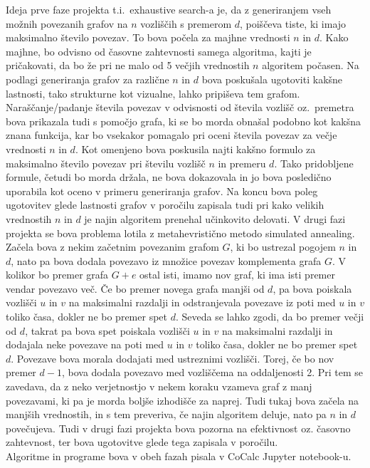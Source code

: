 \documentclass[12pt,a4paper]{amsart}
\theoremstyle{definition} %
\theoremstyle{plain} %
\begin{document}
Ideja prve faze projekta t.i.\ exhaustive search-a je, da z generiranjem vseh možnih povezanih grafov na $n$ vozliščih s premerom $d$, 
poiščeva tiste, ki imajo maksimalno število povezav. To bova počela za majhne vrednosti $n$ in $d$. Kako majhne, bo odvisno od časovne 
zahtevnosti samega algoritma, kajti je pričakovati, da bo že pri ne malo od 5 večjih vrednostih $n$ algoritem počasen. Na podlagi 
generiranja grafov za različne $n$ in $d$ bova poskušala ugotoviti kakšne lastnosti, tako strukturne kot vizualne, lahko pripiševa 
tem grafom. Naraščanje/padanje števila povezav v odvisnosti od števila vozlišč oz.\ premetra bova prikazala tudi s pomočjo grafa, 
ki se bo morda obnašal podobno kot kakšna znana funkcija, kar bo vsekakor pomagalo pri oceni števila povezav za večje vrednosti $n$ 
in $d$. Kot omenjeno bova poskusila najti kakšno formulo za maksimalno število povezav pri številu vozlišč $n$ in premeru $d$. Tako 
pridobljene formule, četudi bo morda držala, ne bova dokazovala in jo bova posledično uporabila kot oceno v primeru generiranja grafov. 
Na koncu bova poleg ugotovitev glede lastnosti grafov v poročilu zapisala tudi pri kako velikih vrednostih $n$ in $d$ je najin algoritem 
prenehal učinkovito delovati. V drugi fazi projekta se bova problema lotila z metahevristično metodo simulated annealing. Začela bova z 
nekim začetnim povezanim grafom $G$, ki bo ustrezal pogojem $n$ in $d$, nato pa bova dodala povezavo iz množice povezav komplementa grafa $G$. 
V kolikor bo premer grafa $G + e$ ostal isti, imamo nov graf, ki ima isti premer vendar povezavo več. Če bo premer novega grafa manjši od $d$, 
pa bova poiskala vozlišči $u$ in $v$ na maksimalni razdalji in odstranjevala povezave iz poti med $u$ in $v$ toliko časa, dokler ne bo premer 
spet $d$. Seveda se lahko zgodi, da bo premer večji od $d$, takrat pa bova spet poiskala vozlišči $u$ in $v$ na maksimalni razdalji in dodajala 
neke povezave na poti med $u$ in $v$ toliko časa, dokler ne bo premer spet $d$. Povezave bova morala dodajati med ustreznimi vozlišči. Torej, 
če bo nov premer $d-1$, bova dodala povezavo med vozliščema na oddaljenosti 2. Pri tem se zavedava, da z neko verjetnostjo v nekem koraku vzameva 
graf z manj povezavami, ki pa je morda boljše izhodišče za naprej. \pagebreak Tudi tukaj bova začela na manjših vrednostih, in s tem preveriva, če najin 
algoritem deluje, nato pa $n$ in $d$ povečujeva. Tudi v drugi fazi projekta bova pozorna na efektivnost oz. časovno zahtevnost, ter bova ugotovitve 
glede tega zapisala v poročilu.\\
Algoritme in programe bova v obeh fazah pisala v CoCalc Jupyter notebook-u.
\end{document}
